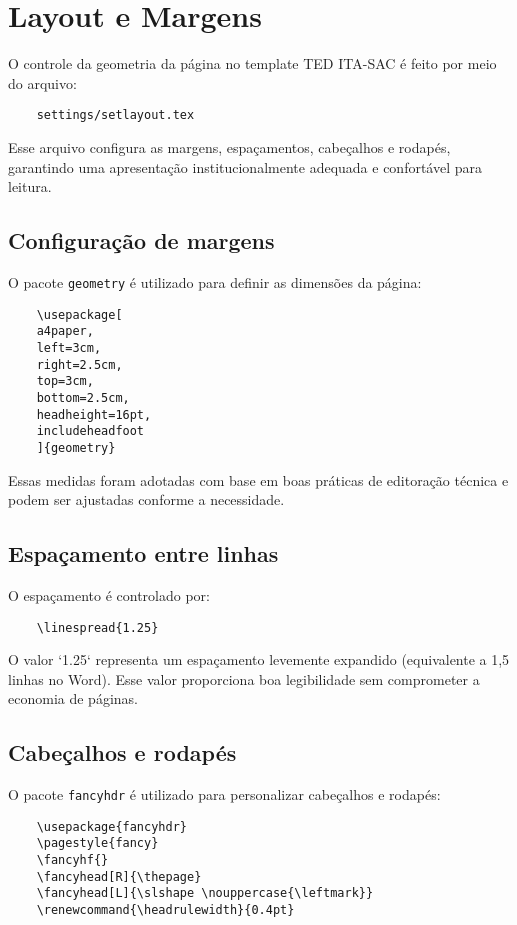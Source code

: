 \chapter{Layout e Margens}

O controle da geometria da página no template TED ITA-SAC é feito por meio do arquivo:

\begin{verbatim}
	settings/setlayout.tex
\end{verbatim}

Esse arquivo configura as margens, espaçamentos, cabeçalhos e rodapés, garantindo uma apresentação institucionalmente adequada e confortável para leitura.

\section{Configuração de margens}

O pacote \texttt{geometry} é utilizado para definir as dimensões da página:

\begin{verbatim}
	\usepackage[
	a4paper,
	left=3cm,
	right=2.5cm,
	top=3cm,
	bottom=2.5cm,
	headheight=16pt,
	includeheadfoot
	]{geometry}
\end{verbatim}

Essas medidas foram adotadas com base em boas práticas de editoração técnica e podem ser ajustadas conforme a necessidade.

\section{Espaçamento entre linhas}

O espaçamento é controlado por:

\begin{verbatim}
	\linespread{1.25}
\end{verbatim}

O valor `1.25` representa um espaçamento levemente expandido (equivalente a 1,5 linhas no Word). Esse valor proporciona boa legibilidade sem comprometer a economia de páginas.

\section{Cabeçalhos e rodapés}

O pacote \texttt{fancyhdr} é utilizado para personalizar cabeçalhos e rodapés:

\begin{verbatim}
	\usepackage{fancyhdr}
	\pagestyle{fancy}
	\fancyhf{}
	\fancyhead[R]{\thepage}
	\fancyhead[L]{\slshape \nouppercase{\leftmark}}
	\renewcommand{\headrulewidth}{0.4pt}
\end{verbatim}

